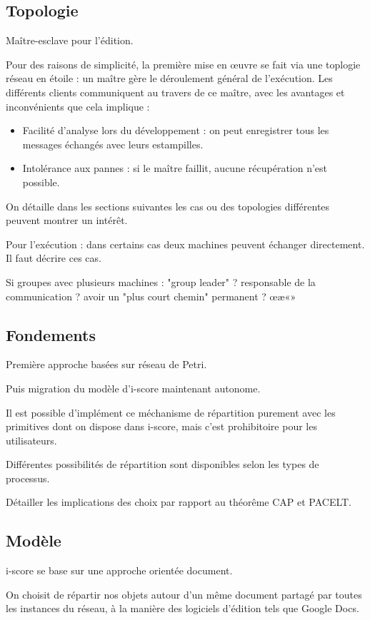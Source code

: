 \documentclass{article}
\begin{document}
\subsection{Topologie}
Maître-esclave pour l'édition.

Pour des raisons de simplicité, la première mise en œuvre se fait via une toplogie réseau en étoile : un maître gère 
le déroulement général de l'exécution. 
Les différents clients communiquent au travers de ce maître, avec les avantages et inconvénients que cela implique : 
\begin{itemize}
	\item Facilité d'analyse lors du développement : on peut enregistrer tous les messages échangés avec leurs estampilles.
	\item Intolérance aux pannes : si le maître faillit, aucune récupération n'est possible.
\end{itemize}

On détaille dans les sections suivantes les cas ou des topologies différentes peuvent montrer un intérêt.

Pour l'exécution : dans certains cas deux machines peuvent échanger directement.
Il faut décrire ces cas.

Si groupes avec plusieurs machines : "group leader" ? responsable de la communication ? avoir un "plus court chemin" permanent ?
œæ«»
\subsection{Fondements}
Première approche basées sur réseau de Petri.

Puis migration du modèle d'i-score maintenant autonome.

Il est possible d'implément ce méchanisme de répartition purement avec les primitives dont on dispose dans i-score, 
mais c'est prohibitoire pour les utilisateurs.

Différentes possibilités de répartition sont disponibles selon les types de processus.

Détailler les implications des choix par rapport au théorême CAP et PACELT.
\subsection{Modèle}
i-score se base sur une approche orientée document.

On choisit de répartir nos objets autour d'un même document partagé par toutes les instances du réseau, 
à la manière des logiciels d'édition tels que Google Docs. %
\end{document}

